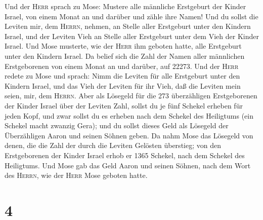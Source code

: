  Und der \textsc{Herr} sprach zu Mose: Mustere alle
männliche Erstgeburt der Kinder Israel, von einem Monat an und darüber
und zähle ihre Namen!  Und du sollst die Leviten mir, dem
\textsc{Herrn}, nehmen, an Stelle aller Erstgeburt unter den Kindern
Israel, und der Leviten Vieh an Stelle aller Erstgeburt unter dem Vieh
der Kinder Israel.  Und Mose musterte, wie der
\textsc{Herr} ihm geboten hatte, alle Erstgeburt unter den Kindern
Israel.  Da belief sich die Zahl der Namen aller
männlichen Erstgeborenen von einem Monat an und darüber, auf 22273.
 Und der \textsc{Herr} redete zu Mose und sprach:
 Nimm die Leviten für alle Erstgeburt unter den Kindern
Israel, und das Vieh der Leviten für ihr Vieh, daß die Leviten mein
seien, mir, dem \textsc{Herrn}.  Aber als Lösegeld für
die 273 überzähligen Erstgeborenen der Kinder Israel über der Leviten
Zahl,  sollst du je fünf Schekel erheben für jeden Kopf,
und zwar sollst du es erheben nach dem Schekel des Heiligtums (ein
Schekel macht zwanzig Gera);  und du sollst dieses Geld
als Lösegeld der Überzähligen Aaron und seinen Söhnen geben.
 Da nahm Mose das Lösegeld von denen, die die Zahl der
durch die Leviten Gelösten überstieg;  von den
Erstgeborenen der Kinder Israel erhob er 1365 Schekel, nach dem Schekel
des Heiligtums.  Und Mose gab das Geld Aaron und seinen
Söhnen, nach dem Wort des \textsc{Herrn}, wie der \textsc{Herr} Mose
geboten hatte.

\hypertarget{section-3}{%
\section{4}\label{section-3}}

